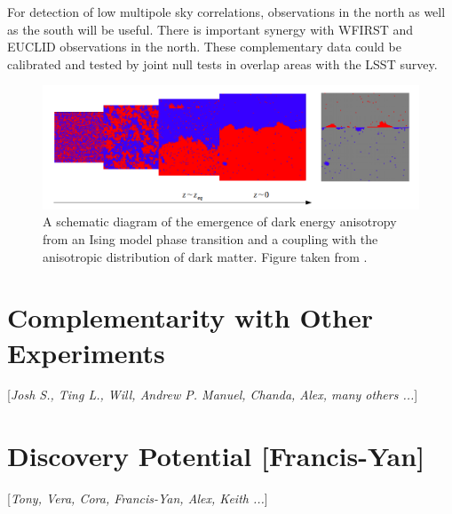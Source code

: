 \documentclass[modern,linenumbers]{aastex62}
\newcommand{\Contributors}[1]{ {\footnotesize [\textit{#1}]}}
\newcommand{\Contact}[1]{ {\footnotesize [\textbf{#1}]}}
\begin{document}
For detection of low multipole sky correlations, observations in the north as well as the south will be useful.
There is important synergy with WFIRST and EUCLID observations in the north.  
These complementary data could be calibrated and tested by joint null tests in overlap areas with the LSST survey.

\begin{figure}[t]
\centering
\includegraphics[width=0.9\columnwidth]{DMDE-anisotropy.png}
\caption{A schematic diagram of the emergence of dark energy anisotropy from an Ising model phase transition and a coupling with the anisotropic distribution of dark matter. Figure taken from \cite{1810.11007}.}
\label{fig:DMDEmap}
\end{figure}

\section{Complementarity with Other Experiments}
\Contributors{Josh S., Ting L., Will, Andrew P. Manuel, Chanda, Alex, many others ...}
\label{sec:complementarity}



\section{Discovery Potential \Contact{Francis-Yan}}
\Contributors{Tony, Vera, Cora, Francis-Yan, Alex, Keith ...}
\label{sec:discovery}
\end{document}
